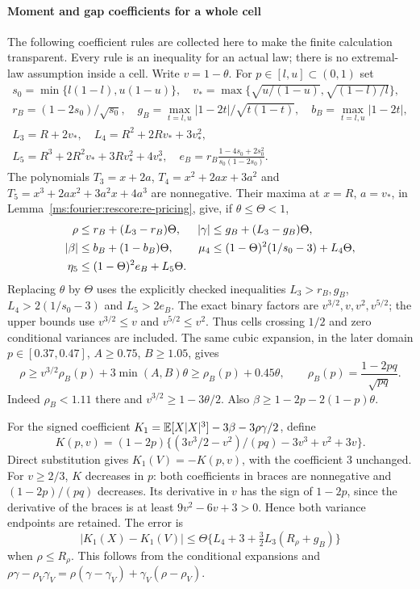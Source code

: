\paragraph{Moment and gap coefficients for a whole cell}
\label{ms:fourier:rescore:mom-conditional-boxes}

The following coefficient rules are collected here to make the finite
calculation transparent. Every rule is an inequality for an actual law;
there is no extremal-law assumption inside a cell.
Write $v=1-\theta$. For $p\in[l,u]\subset(0,1)$ set
\begin{gather*}
 s_0=\min\{l(1-l),u(1-u)\},\quad
 v_* =\max\{\sqrt{u/(1-u)},\sqrt{(1-l)/l}\},\\
 r_B=(1-2s_0)/\sqrt{s_0},\quad
 g_B=\max_{t=l,u}|1-2t|/\sqrt{t(1-t)},\quad b_B=\max_{t=l,u}|1-2t|,\\
 L_3=R+2v_*,\quad L_4=R^2+2Rv_*+3v_*^2,\\
 L_5=R^3+2R^2v_*+3Rv_*^2+4v_*^3,\quad
 e_B=r_B\frac{1-4s_0+2s_0^2}{s_0(1-2s_0)}.
\end{gather*}
The polynomials $T_3=x+2a$, $T_4=x^2+2ax+3a^2$ and
$T_5=x^3+2ax^2+3a^2x+4a^3$ are nonnegative. Their maxima at
$x=R$, $a=v_*$, in Lemma~\ref{ms:fourier:rescore:re-pricing}, give, if $\theta\le\Theta<1$,
\begin{align}
 \rho&\le r_B+(L_3-r_B)\Theta,&
 |\gamma|&\le g_B+(L_3-g_B)\Theta,\notag\\
 |\beta|&\le b_B+(1-b_B)\Theta,&
 \mu_4&\le(1-\Theta)^2(1/s_0-3)+L_4\Theta,\notag\\
 \eta_5&\le(1-\Theta)^2e_B+L_5\Theta.&&\label{ms:fourier:rescore:mom-boxes}
\end{align}
Replacing $\theta$ by $\Theta$ uses the explicitly checked inequalities
$L_3>r_B,g_B$, $L_4>2(1/s_0-3)$ and $L_5>2e_B$.
The exact binary factors are $v^{3/2},v,v^2,v^{5/2}$; the upper bounds
use $v^{3/2}\le v$ and $v^{5/2}\le v^2$. Thus cells crossing $1/2$ and
zero conditional variances are included. The same cubic expansion, in the
later domain $p\in[0.37,0.47]$, $A\ge0.75$, $B\ge1.05$, gives
\begin{equation}\label{ms:fourier:rescore:mom-rho-lower}
 \rho\ge v^{3/2}\rho_B(p)+3\min(A,B)\theta
       \ge\rho_B(p)+0.45\theta,\qquad
 \rho_B(p)=\frac{1-2pq}{\sqrt{pq}}.
\end{equation}
Indeed $\rho_B<1.11$ there and $v^{3/2}\ge1-3\theta/2$.
Also $\beta\ge1-2p-2(1-p)\theta$.

For the signed coefficient
$K_1=\mathbb E[X|X|^3]-3\beta-3\rho\gamma/2$, define
\[
 K(p,v)=(1-2p)\{(3v^3/2-v^2)/(pq)-3v^3+v^2+3v\}.
\]
Direct substitution gives $K_1(V)=-K(p,v)$, with the coefficient $3$
unchanged. For $v\ge2/3$, $K$ decreases in $p$: both coefficients in
braces are nonnegative and $(1-2p)/(pq)$ decreases. Its derivative in $v$
has the sign of $1-2p$, since the derivative of the braces is at least
$9v^2-6v+3>0$. Hence both variance endpoints are retained. The error is
\begin{equation}\label{ms:fourier:rescore:mom-K-error}
 |K_1(X)-K_1(V)|\le
 \Theta\{L_4+3+\tfrac32L_3(R_\rho+g_B)\}
\end{equation}
when $\rho\le R_\rho$. This follows from the conditional expansions and
$\rho\gamma-\rho_V\gamma_V=
\rho(\gamma-\gamma_V)+\gamma_V(\rho-\rho_V)$.

